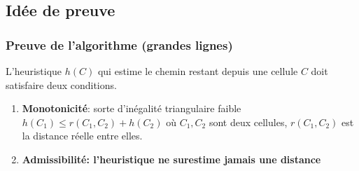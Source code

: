 \documentclass{beamer}
\begin{document}
\subsection{Idée de preuve}
\begin{frame}
  \frametitle{Preuve de l'algorithme (grandes lignes)}
  L'heuristique $h(C)$ qui estime le chemin restant depuis une cellule $C$
  doit satisfaire deux conditions.
  \begin{enumerate}
  \item<2-> \textbf{Monotonicité}: sorte d'inégalité triangulaire faible
    $h(C_1) \leq r(C_1,C_2) + h(C_2)$ où $C_1, C_2$ sont deux cellules,
    $r(C_1, C_2)$ est la distance réelle entre elles.
    \par\smallskip
  \item<3-> \textbf{Admissibilité: l'heuristique ne surestime jamais une distance}
    \par\smallskip
    \par\smallskip
  \end{enumerate}
\end{frame}
\end{document}
